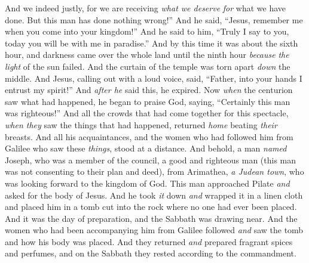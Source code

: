 \begin{biblechapter}
\verse And we indeed justly, for we are receiving \textit{what we deserve} \textit{for} what we have done. But this man has done nothing wrong!”
\verse And he said, “Jesus, remember me when you come into your kingdom!”
\verse And he said to him, “Truly I say to you, today you will be with me in paradise.”
 And by this time it was about the sixth hour, and darkness came over the whole land until the ninth hour
\verse \textit{because} \textit{the light} of the sun failed. And the curtain of the temple was torn apart \textit{down} the middle.
\verse And Jesus, calling out with a loud voice, said, “Father, into your hands I entrust my spirit!” And \textit{after he} said this, he expired.
\verse Now \textit{when} the centurion saw what had happened, he began to praise God, saying, “Certainly this man was righteous!”
\verse And all the crowds that had come together for this spectacle, \textit{when they} saw the things that had happened, returned \textit{home} beating \textit{their} breasts.
\verse And all his acquaintances, and the women who had followed him from Galilee who saw these \textit{things}, stood at a distance.
 And behold, a man \textit{named} Joseph, who was a member of the council, a good and righteous man
\verse (this man was not consenting to their plan and deed), from Arimathea, \textit{a Judean town}, who was looking forward to the kingdom of God.
\verse This man approached Pilate \textit{and} asked for the body of Jesus.
\verse And he took \textit{it} down \textit{and} wrapped it in a linen cloth and placed him in a tomb cut into the rock where no one had ever been placed.
\verse And it was the day of preparation, and the Sabbath was drawing near.
\verse And the women who had been accompanying him from Galilee followed \textit{and} saw the tomb and how his body was placed.
\verse And they returned \textit{and} prepared fragrant spices and perfumes, and on the Sabbath they rested according to the commandment.
\end{biblechapter}

